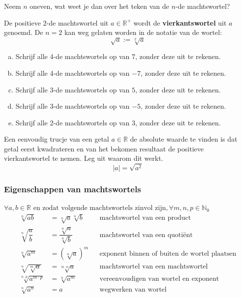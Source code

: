 \documentclass[12pt,twoside,a4paper]{article}
\begin{document}
\begin{oefening}
Neem $n$ oneven, wat weet je dan over het teken van de $n$-de machtswortel?
\end{oefening}

De positieve $2$-de machtswortel uit $a\in\mathbb{R}^+$ wordt de {\bf vierkantswortel} uit $a$ genoemd. De $n=2$ kan weg gelaten worden in de notatie van de wortel:
$$\sqrt{a}:=\sqrt[2]{a}$$

\begin{oefening}
\begin{enumerate}[(a)]
  \item Schrijf alle 4-de machtswortels op van $7$, zonder deze uit te rekenen.
  \item Schrijf alle 4-de machtswortels op van $-7$, zonder deze uit te rekenen.
  \item Schrijf alle 3-de machtswortels op van $5$, zonder deze uit te rekenen.
  \item Schrijf alle 3-de machtswortels op van $-5$, zonder deze uit te rekenen.
  \item Schrijf alle 2-de machtswortels op van $3$, zonder deze uit te rekenen.
\end{enumerate}
\end{oefening}

\begin{oefening}
Een eenvoudig trucje van een getal $a\in\mathbb{R}$ de absolute waarde te vinden is dat getal eerst kwadrateren en van het bekomen resultaat de positieve vierkantswortel te nemen. Leg uit waarom dit werkt.
$$|a| = \sqrt{a^2}$$
\end{oefening}

\subsubsection*{Eigenschappen van machtswortels}
\begin{mdframed}
$\forall a, b \in\mathbb{R}\mbox{ en zodat volgende machtswortels zinvol zijn}, \forall m,n,p\in\mathbb{N}_0$
\begin{align*}
  \sqrt[n]{ab} &= \sqrt[n]{a}\sqrt[n]{b} && \mbox{machtswortel van een product}\\
  \sqrt[n]{\dfrac{a}{b}} &= \dfrac{\sqrt[n]{a}}{\sqrt[n]{b}} &&  \mbox{machtswortel van een quotiënt}\\
  \sqrt[n]{a^m} &= \left(\sqrt[n]{a}\right)^m && \mbox{exponent binnen of buiten de wortel plaatsen}\\
  \sqrt[n]{\sqrt[m]{a}} &= \sqrt[m\cdot n]{a} && \mbox{machtswortel van een machtswortel}\\
  \sqrt[n\cdot p]{a^{m\cdot p}} &= \sqrt[n]{a^m} && \mbox{vereenvoudigen van wortel en exponent}\\
  \sqrt[n]{a^n} &= a && \mbox{wegwerken van wortel}
\end{align*}
\end{mdframed}
\end{document}
